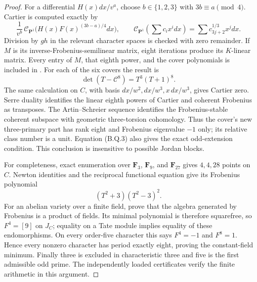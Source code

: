 \begin{proof}
For a differential $H(x)dx/v^a$, choose $b\in\{1,2,3\}$
with $3b\equiv a\pmod4$. Cartier is computed exactly by
\[
 \frac{1}{v^b}\,\mathcal C_{\mathbf P^1}
       \bigl(H(x)F(x)^{(3b-a)/4}dx\bigr),\qquad
 \mathcal C_{\mathbf P^1}\left(\sum c_ix^i dx\right)
       =\sum c_{3j+2}^{1/3}x^jdx.
\]
Division by $gh$ in the relevant character spaces is checked
with zero remainder. If $M$ is its inverse-Frobenius-semilinear
matrix, eight iterations produce its $K$-linear matrix. Every
entry of $M$, that eighth power, and the cover polynomials is
included in . For each of the
six covers the result is
\[
     \det(T-\mathcal C^8)=T^3(T+1)^8.                 \tag{B.Q.3}
\]
The same calculation on $C$, with basis
$dx/w^2,dx/w^3,x\,dx/w^3$, gives Cartier zero.
Serre duality identifies the linear eighth powers of Cartier
and coherent Frobenius as transposes. The Artin--Schreier
sequence identifies the Frobenius-stable coherent subspace
with geometric three-torsion cohomology. Thus the cover's
new three-primary part has rank eight and Frobenius eigenvalue
$-1$ only; its relative class number is a unit. Equation
(B.Q.3) also gives the exact odd-extension condition. This
conclusion is insensitive to possible Jordan blocks.

For completeness, exact enumeration over $\mathbf F_3$,
$\mathbf F_9$, and $\mathbf F_{27}$ gives $4,4,28$ points
on $C$. Newton identities and the reciprocal functional
equation give its Frobenius polynomial
\[
                     (T^2+3)(T^2-3)^2.
\]
For an abelian variety over a finite field,
\citep[Chapter~II, Lemma~1.3 and Remark~1.4]{MilneAV2008}
prove that the algebra generated by Frobenius is a product
of fields. Its minimal polynomial is therefore squarefree,
so $F^4=[9]$ on $J_C$;
equality on a Tate module implies equality of these
endomorphisms. On every order-five character this says
$F^4=-1$ and $F^8=1$. Hence every nonzero character has
period exactly eight, proving the constant-field minimum.
Finally three is excluded in characteristic three and five
is the first admissible odd prime. The independently loaded
certificates verify the finite arithmetic in this argument.
\end{proof}

